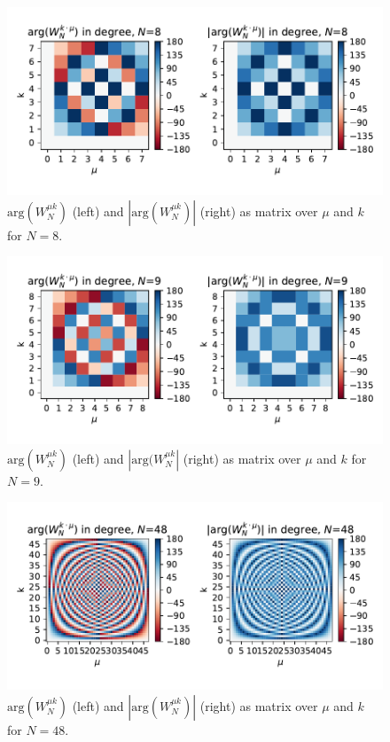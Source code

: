 \documentclass[11pt,a4paper,DIV=12]{scrartcl}
\begin{document}
\begin{figure}[b!]
		\centering
		\includegraphics[]{graphics/TwiddleFactorMatrix_N8.pdf}
		\caption{$\text{arg}(W_N^{\mu k})$ (left) and $|\text{arg}(W_N^{\mu k})|$
		(right) as matrix over $\mu$ and $k$ for $N=8$.}
		\label{Twiddle1}
\end{figure}
\begin{figure}[t]
		\centering
		\includegraphics[]{graphics/TwiddleFactorMatrix_N9.pdf}
		\caption{$\text{arg}(W_N^{\mu k})$ (left) and $|\text{arg}(W_N^{\mu k}|$
		(right) as matrix over $\mu$ and $k$ for $N=9$.}
		\label{Twiddle2}
\end{figure}
\begin{figure}
		\centering
		\includegraphics[]{graphics/TwiddleFactorMatrix_N48.pdf}
		\caption{$\text{arg}(W_N^{\mu k})$ (left) and $|\text{arg}(W_N^{\mu k})|$
		(right) as matrix over $\mu$ and $k$ for $N=48$.}
		\label{Twiddle3}
\end{figure}
\end{document}
